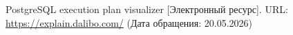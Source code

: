 \begin{thebibliography}{}
     PostgreSQL execution plan visualizer
     [Электронный ресурс]. URL: \href{https://explain.dalibo.com/}{https://explain.dalibo.com/} (Дата обращения: 20.05.2026)



\end{thebibliography}
\newpage

\fi
